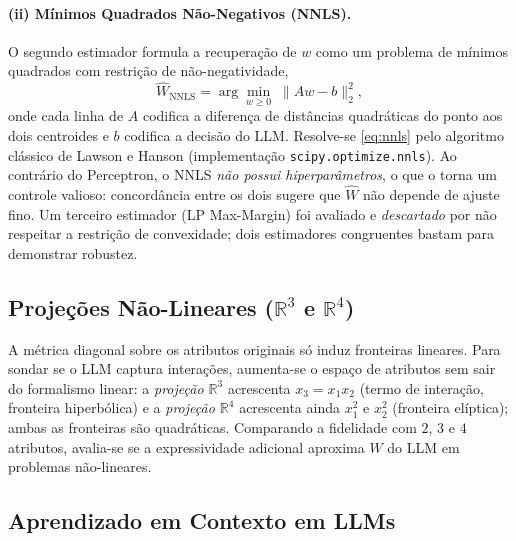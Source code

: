 \documentclass[12pt,a4paper]{article}
\newcommand{\West}{\ensuremath{\hat{W}}}   %
\begin{document}
\paragraph{(ii) Mínimos Quadrados Não-Negativos (NNLS).}
O segundo estimador formula a recuperação de $w$ como um problema de mínimos quadrados com
restrição de não-negatividade,
\begin{equation}
  \West_{\text{NNLS}} = \arg\min_{w \geq 0} \; \lVert A w - b \rVert_2^2,
  \label{eq:nnls}
\end{equation}
onde cada linha de $A$ codifica a diferença de distâncias quadráticas do ponto aos dois
centroides e $b$ codifica a decisão do LLM. Resolve-se \eqref{eq:nnls} pelo algoritmo
clássico de Lawson e Hanson \cite{lawsonSolvingLeastSquares1974} (implementação
\texttt{scipy.optimize.nnls}). Ao contrário do Perceptron, o NNLS \emph{não possui
hiperparâmetros}, o que o torna um controle valioso: concordância entre os dois sugere que
\West{} não depende de ajuste fino. Um terceiro estimador (LP Max-Margin) foi avaliado e
\emph{descartado} por não respeitar a restrição de convexidade; dois estimadores congruentes
bastam para demonstrar robustez.

\subsection{Projeções Não-Lineares (\texorpdfstring{$\mathbb{R}^3$ e $\mathbb{R}^4$}{R3 e R4})}
\label{sec:r3r4}

A métrica diagonal sobre os atributos originais só induz fronteiras lineares. Para
sondar se o LLM captura interações, aumenta-se o espaço de atributos sem sair do
formalismo linear: a \emph{projeção $\mathbb{R}^3$} acrescenta $x_3 = x_1 x_2$ (termo de
interação, fronteira hiperbólica) e a \emph{projeção $\mathbb{R}^4$} acrescenta ainda
$x_1^2$ e $x_2^2$ (fronteira
elíptica); ambas as fronteiras são quadráticas. Comparando a fidelidade com
$2$, $3$ e $4$ atributos, avalia-se se a expressividade adicional aproxima \West{} do
LLM em problemas não-lineares.

\subsection{Aprendizado em Contexto em LLMs}
\end{document}
